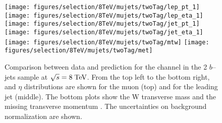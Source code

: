 %
\begin{figure}
  \centering
  \texttt{[image: figures/selection/8TeV/mujets/twoTag/lep\_pt\_1]}
  \texttt{[image: figures/selection/8TeV/mujets/twoTag/lep\_eta\_1]}
  \texttt{[image: figures/selection/8TeV/mujets/twoTag/jet\_pt\_1]}
  \texttt{[image: figures/selection/8TeV/mujets/twoTag/jet\_eta\_1]}
  \texttt{[image: figures/selection/8TeV/mujets/twoTag/mtw]}
  \texttt{[image: figures/selection/8TeV/mujets/twoTag/met]}
  \caption{Comparison between data and prediction for the \mujets{}
    channel in the 2 $b$--jets sample at $\sqrt{s} = 8 \; \mathrm{TeV}{}$.  From
    the top left to the bottom right, \pt{} and $\eta$ distributions are shown for the
    muon (top) and for the leading jet (middle). The bottom plots show
    the W transverse mass \mtw{} and the missing transverse
    momentum \met{}. 
    The uncertainties on background normalization are shown.
  }
  \label{fig:2012mu_2tag}
\end{figure}

